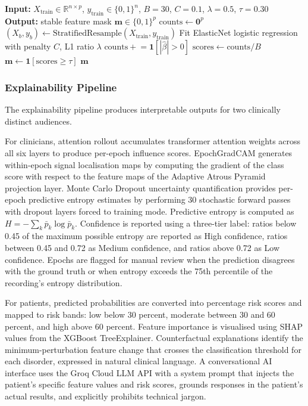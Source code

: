 \begin{algorithm}[h]
\caption{ElasticNet Bootstrap Stability Selection}\label{alg:elasticnet}
\begin{algorithmic}[1]
\State \textbf{Input:} $X_{\text{train}} \in \mathbb{R}^{n \times p}$, $y_{\text{train}} \in \{0,1\}^n$, $B=30$, $C=0.1$, $\lambda=0.5$, $\tau=0.30$
\State \textbf{Output:} stable feature mask $\mathbf{m} \in \{0,1\}^p$
\State $\text{counts} \gets \mathbf{0}^p$
    \State $(X_b, y_b) \gets \text{StratifiedResample}(X_{\text{train}}, y_{\text{train}})$
    \State Fit ElasticNet logistic regression with penalty $C$, L1 ratio $\lambda$
    \State $\text{counts} \mathrel{+}= \mathbf{1}[|\hat{\beta}| > 0]$
\EndFor
\State $\text{scores} \gets \text{counts} / B$
\State $\mathbf{m} \gets \mathbf{1}[\text{scores} \geq \tau]$
\State \Return $\mathbf{m}$
\end{algorithmic}
\end{algorithm}

\subsubsection{Explainability Pipeline}

The explainability pipeline produces interpretable outputs for two clinically distinct audiences.

For clinicians, attention rollout accumulates transformer attention weights across all six layers to produce per-epoch influence scores. EpochGradCAM \cite{selvaraju2017gradcam} generates within-epoch signal localisation maps by computing the gradient of the class score with respect to the feature maps of the Adaptive Atrous Pyramid projection layer. Monte Carlo Dropout uncertainty quantification \cite{gal2016dropout} provides per-epoch predictive entropy estimates by performing 30 stochastic forward passes with dropout layers forced to training mode. Predictive entropy is computed as $H = -\sum_{k} \bar{p}_k \log \bar{p}_k$. Confidence is reported using a three-tier label: ratios below 0.45 of the maximum possible entropy are reported as High confidence, ratios between 0.45 and 0.72 as Medium confidence, and ratios above 0.72 as Low confidence. Epochs are flagged for manual review when the prediction disagrees with the ground truth or when entropy exceeds the 75th percentile of the recording's entropy distribution.

For patients, predicted probabilities are converted into percentage risk scores and mapped to risk bands: low below 30 percent, moderate between 30 and 60 percent, and high above 60 percent. Feature importance is visualised using SHAP values \cite{lundberg2017shap} from the XGBoost TreeExplainer. Counterfactual explanations identify the minimum-perturbation feature change that crosses the classification threshold for each disorder, expressed in natural clinical language. A conversational AI interface uses the Groq Cloud LLM API with a system prompt that injects the patient's specific feature values and risk scores, grounds responses in the patient's actual results, and explicitly prohibits technical jargon.

